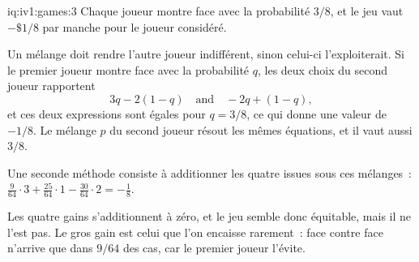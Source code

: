 \begin{solution}{iq:iv1:games:3}
Chaque joueur montre face avec la probabilité $3/8$, et le jeu vaut $-\$1/8$ par manche pour le joueur considéré.

Un mélange doit rendre l'autre joueur indifférent, sinon celui-ci l'exploiterait. Si le premier joueur montre face avec la probabilité $q$, les deux choix du second joueur rapportent
\[
3q - 2(1 - q) \quad\text{and}\quad -2q + (1 - q),
\]
et ces deux expressions sont égales pour $q = 3/8$, ce qui donne une valeur de $-1/8$. Le mélange $p$ du second joueur résout les mêmes équations, et il vaut aussi $3/8$.

Une seconde méthode consiste à additionner les quatre issues sous ces mélanges~: $\tfrac{9}{64} \cdot 3 + \tfrac{25}{64} \cdot 1 - \tfrac{30}{64} \cdot 2 = -\tfrac18$.

Les quatre gains s'additionnent à zéro, et le jeu semble donc équitable, mais il ne l'est pas. Le gros gain est celui que l'on encaisse rarement~: face contre face n'arrive que dans $9/64$ des cas, car le premier joueur l'évite.

\end{solution}

